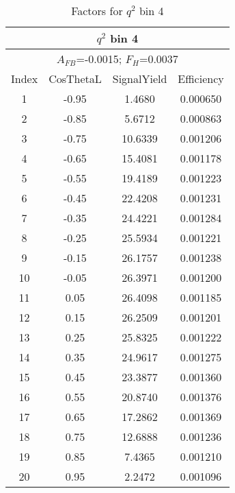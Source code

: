 \begin{table*}[htbH]
  \begin{center}
  \caption{Factors for $q^2$ bin 4 
  \label{tab:factors_bin4}}
  \small
  \begin{tabular}{|c||c|c|c|}
    \hline
    \multicolumn{4}{|c|}{$q^2$ bin 4} \\ 
    \hline
    \multicolumn{4}{|c|}{$A_{FB}$=-0.0015;   $F_{H}$=0.0037} \\ 
    \hline
    Index & CosThetaL & SignalYield & Efficiency \\ 
    \hline
    1 & -0.95 & 1.4680 & 0.000650 \\ 
    2 & -0.85 & 5.6712 & 0.000863 \\ 
    3 & -0.75 & 10.6339 & 0.001206 \\ 
    4 & -0.65 & 15.4081 & 0.001178 \\ 
    5 & -0.55 & 19.4189 & 0.001223 \\ 
    6 & -0.45 & 22.4208 & 0.001231 \\ 
    7 & -0.35 & 24.4221 & 0.001284 \\ 
    8 & -0.25 & 25.5934 & 0.001221 \\ 
    9 & -0.15 & 26.1757 & 0.001238 \\ 
    10 & -0.05 & 26.3971 & 0.001200 \\ 
    11 & 0.05 & 26.4098 & 0.001185 \\ 
    12 & 0.15 & 26.2509 & 0.001201 \\ 
    13 & 0.25 & 25.8325 & 0.001222 \\ 
    14 & 0.35 & 24.9617 & 0.001275 \\ 
    15 & 0.45 & 23.3877 & 0.001360 \\ 
    16 & 0.55 & 20.8740 & 0.001376 \\ 
    17 & 0.65 & 17.2862 & 0.001369 \\ 
    18 & 0.75 & 12.6888 & 0.001236 \\ 
    19 & 0.85 & 7.4365 & 0.001210 \\ 
    20 & 0.95 & 2.2472 & 0.001096 \\ 
    \hline
  \end{tabular}
  \end{center}
\end{table*}


